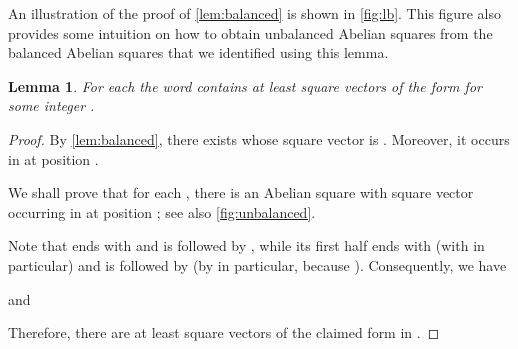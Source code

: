\documentclass{article}
\theoremstyle{plain}
\newtheorem{lemma}[theorem]{Lemma}
\theoremstyle{definition}
\theoremstyle{remark}
\begin{document}
  
  An illustration of the proof of \cref{lem:balanced} is shown in \cref{fig:lb}.
  This figure also provides some intuition on how to obtain unbalanced Abelian squares
  from the balanced Abelian squares that we identified using this lemma.
  
  \begin{lemma}\label{lem:unbalanced}
  For each  the word  contains at least 
  square vectors of the form  for some integer .
  \end{lemma}
  \begin{proof}
  By \cref{lem:balanced}, there exists  whose square vector is .
  Moreover, it occurs in  at position .
  
  We shall prove that for each , 
  there is an Abelian square with square vector  occurring in  at position ; see also \cref{fig:unbalanced}.
  
  Note that  ends with  and is followed by ,
  while its first half ends with  (with  in particular) and is followed by 
  (by  in particular, because ). 
  Consequently, we have
  
  and
  
  Therefore, there are at least 
  square vectors of the claimed form in .  
  \end{proof}
\end{document}
